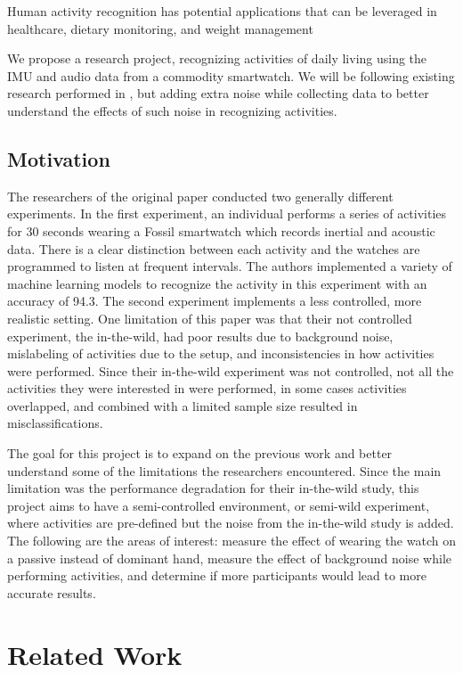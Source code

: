 \documentclass[conference]{IEEEtran}
\begin{document}
	Human activity recognition has potential applications that can be leveraged in healthcare, dietary monitoring, and weight management
	
	We propose a research project, recognizing activities of daily living using the IMU and audio data from a commodity smartwatch. 
	We will be following existing research performed in \cite{2022_Leveraging_sound}, but adding extra noise while collecting data to better understand the effects of such noise in recognizing activities.
	
	\subsection{Motivation}
	The researchers of the original paper conducted two generally different experiments. In the first experiment, an individual performs a series of activities for 30 seconds wearing a Fossil smartwatch which records inertial and acoustic data. There is a clear distinction between each activity and the watches are programmed to listen at frequent intervals. The authors implemented a variety of machine learning models to recognize the activity in this experiment with an accuracy of 94.3. The second experiment implements a less controlled, more realistic setting.
	One limitation of this paper was that their not controlled experiment, the in-the-wild, had poor results due to background noise, mislabeling of activities due to the setup, and inconsistencies in how activities were performed.
	Since their in-the-wild experiment was not controlled, not all the activities they were interested in were performed, in some cases activities overlapped, and combined with a limited sample size resulted in misclassifications\cite{2022_Misclassifications}.
	
	The goal for this project is to expand on the previous work and better understand some of the limitations the researchers encountered.
	Since the main limitation was the performance degradation for their in-the-wild study, this project aims to have a semi-controlled environment, or semi-wild experiment, where activities are pre-defined but the noise from the in-the-wild study is added. 
	The following are the areas of interest: measure the effect of wearing the watch on a passive instead of dominant hand, measure the effect of background noise while performing activities, and determine if more participants would lead to more accurate results.
	
	\section{Related Work}
\end{document}
